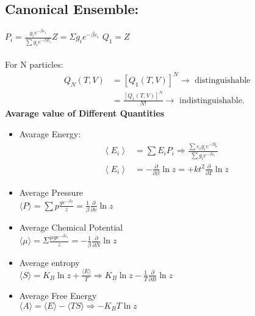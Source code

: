 \subsection{Canonical Ensemble:}
$P_{i}=\frac{g_{i} e^{-\beta \varepsilon_{i}}}{\sum g_{i} e^{-\beta E_{i}}}$\hspace{2cm}$Z=\Sigma g_{i} e^{-\beta \varepsilon_{i}}$
\quad$Q_1 = Z$\\\\
 For N particles:
\begin{align*}
 Q_{N}(T, V) &=\left[Q_{1}(T, V)\right]^{N} \rightarrow \text { distinguishable } \\ &=\frac{\left[Q_{1}(T, V)\right]^{N}}{N !} \rightarrow \text { indistinguishable. } 
 \end{align*}
\textbf{Avarage value of Different Quantities}\\
\begin{itemize}
	\item  Avarage Energy:
	\begin{align*}
	\left\langle E_{i}\right\rangle&=\sum E_{i} P_{i} \Rightarrow \frac{\sum \varepsilon_{i} g_{i} e^{-\beta \xi_{i}}}{\sum g_{i} e^{-\beta \varepsilon_{i}}}\\
	\left\langle E_{i}\right\rangle&=-\frac{\partial}{\partial \beta} \ln z=+k t^{2} \frac{\partial}{\partial T} \ln z
	\end{align*}
	\item  Average Pressure\\
	$\langle P\rangle=\sum p \frac{g e^{-\beta \varepsilon}}{z}=\frac{1}{\beta} \frac{\partial}{\partial v} \ln z$
	\item  Average Chemical Potential\\
	$\langle\mu\rangle=\Sigma \frac{\mu g e^{-\beta \varepsilon_{i}}}{z}=-\frac{1}{\beta} \frac{\partial}{\partial N} \ln z$
	\item  Average entropy\\
	$\langle S\rangle=K_{B} \ln z+\frac{\langle E\rangle}{T} \Rightarrow K_{B} \ln z-\frac{1}{T} \frac{\partial}{\partial B} \ln z$
	\item  Average Free Energy\\
	$\langle A\rangle=\langle E\rangle-\langle TS\rangle \Rightarrow-K_{B} T \ln z$
\end{itemize}



